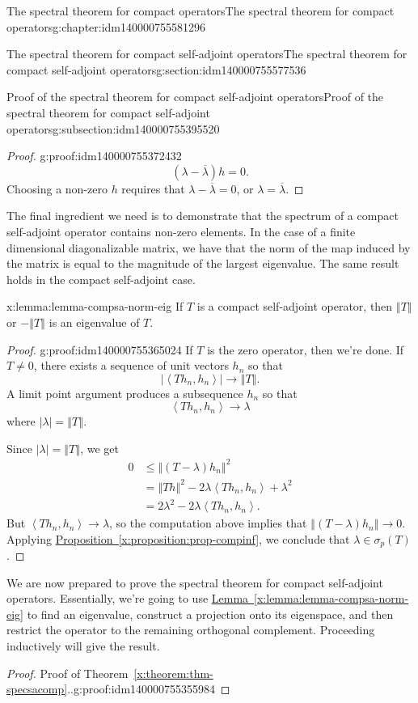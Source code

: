\documentclass[oneside,10pt,]{book}
\newcommand{\xreffont}{\relax}
\numberwithin{equation}{section}
\newcommand{\cc}[1]{\overline{#1}}
\newcommand{\abs}[1]{\left\vert#1\right\vert}
\newcommand{\norm}[1]{\left\Vert#1\right\Vert}
\newcommand{\ip}[2]{\left\langle #1, #2 \right\rangle}
\newcommand\la{\lambda}
\numberwithin{equation}{section}
\newcommand{\amp}{&}
\begin{document}
\begin{chapterptx}{The spectral theorem for compact operators}{}{The spectral theorem for compact operators}{}{}{g:chapter:idm140000755581296}
\begin{sectionptx}{The spectral theorem for compact self-adjoint operators}{}{The spectral theorem for compact self-adjoint operators}{}{}{g:section:idm140000755577536}
\begin{subsectionptx}{Proof of the spectral theorem for compact self-adjoint operators}{}{Proof of the spectral theorem for compact self-adjoint operators}{}{}{g:subsection:idm140000755395520}
\begin{proof}{}{g:proof:idm140000755372432}
\begin{equation*}
(\la - \cc\la)h = 0.
\end{equation*}
Choosing a non-zero \(h\) requires that \(\la - \cc\la = 0\), or \(\la = \cc\la\).%
\end{proof}
The final ingredient we need is to demonstrate that the spectrum of a compact self-adjoint operator contains non-zero elements. In the case of a finite dimensional diagonalizable matrix, we have that the norm of the map induced by the matrix is equal to the magnitude of the largest eigenvalue. The same result holds in the compact self-adjoint case.%
\begin{lemma}{}{}{x:lemma:lemma-compsa-norm-eig}%
If \(T\) is a compact self-adjoint operator, then \(\norm{T}\) or \(-\norm{T}\) is an eigenvalue of \(T\).%
\end{lemma}
\begin{proof}{}{g:proof:idm140000755365024}
If \(T\) is the zero operator, then we're done. If \(T \neq 0\), there exists a sequence of unit vectors \(h_n\) so that%
\begin{equation*}
\abs{\ip{T h_n}{h_n}} \to \norm{T}.
\end{equation*}
A limit point argument produces a subsequence \(h_n\) so that%
\begin{equation*}
\ip{T h_n}{h_n} \to \la
\end{equation*}
where \(\abs{\la} = \norm{T}\).%
\par
Since \(\abs{\la} = \norm{T}\), we get%
\begin{align*}
0 \amp \leq \norm{(T - \la)h_n}^2\\
\amp= \norm{Th}^2 - 2\la\ip{Th_n}{h_n} + \la^2\\
\amp= 2\la^2 - 2 \la\ip{Th_n}{h_n}.
\end{align*}
But \(\ip{Th_n}{h_n} \to \la\), so the computation above implies that \(\norm{(T - \la)h_n} \to 0\). Applying \hyperref[x:proposition:prop-compinf]{Proposition~{\xreffont\ref{x:proposition:prop-compinf}}}, we conclude that \(\la \in \sigma_p(T)\).%
\end{proof}
We are now prepared to prove the spectral theorem for compact self-adjoint operators. Essentially, we're going to use \hyperref[x:lemma:lemma-compsa-norm-eig]{Lemma~{\xreffont\ref{x:lemma:lemma-compsa-norm-eig}}} to find an eigenvalue, construct a projection onto its eigenspace, and then restrict the operator to the remaining orthogonal complement. Proceeding inductively will give the result.%
\begin{proof}{Proof of Theorem~{\xreffont\ref*{x:theorem:thm-specsacomp}}..}{g:proof:idm140000755355984}

\end{proof}
\end{subsectionptx}
\end{sectionptx}
\end{chapterptx}
\end{document}

